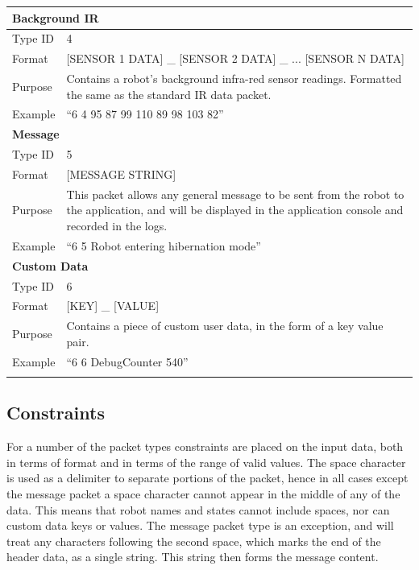 \begin{longtable}{ l p{12cm} }
 \hline
 \multicolumn{2}{p{12cm}}{\textbf{Background IR}}\\
 \hline
 Type ID & 4 \\
 Format & [SENSOR 1 DATA] \_ [SENSOR 2 DATA] \_ ... [SENSOR N DATA] \\
 Purpose & Contains a robot's background infra-red sensor readings. Formatted the same as the standard IR data packet.\\
 Example & ``6 4 95 87 99 110 89 98 103 82''\\
 
 \hline
 \multicolumn{2}{p{12cm}}{\textbf{Message}}\\
 \hline
 Type ID & 5 \\
 Format & [MESSAGE STRING]\\
 Purpose & This packet allows any general message to be sent from the robot to the application, and will be displayed in the application console and recorded in the logs. \\
 Example & ``6 5 Robot entering hibernation mode''\\
 
 \hline
 \multicolumn{2}{p{12cm}}{\textbf{Custom Data}}\\
 \hline
 Type ID & 6 \\
 Format & [KEY] \_ [VALUE]\\
 Purpose & Contains a piece of custom user data, in the form of a key value pair. \\
 Example & ``6 6 DebugCounter 540''\\
 \bottomrule
	
 \label{tab:DataFormat}
\end{longtable}

\subsection{Constraints}
For a number of the packet types constraints are placed on the input data, both in terms of format and in terms of the range of valid values. The space character is used as a delimiter to separate portions of the packet, hence in all cases except the message packet a space character cannot appear in the middle of any of the data. This means that robot names and states cannot include spaces, nor can custom data keys or values. The message packet type is an exception, and will treat any characters following the second space, which marks the end of the header data, as a single string. This string then forms the message content. 

